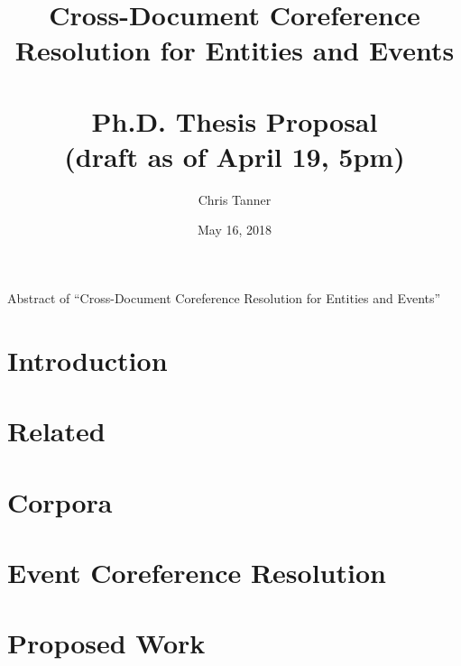 \documentclass[10pt,oneside,openany]{brownthesis}
\begin{document}
\newcommand{\thesistitle}{Cross-Document Coreference Resolution for Entities and Events}
\author{Chris Tanner}
\title{\thesistitle\\~\\ Ph.D. Thesis Proposal \\ (draft as of April 19, 5pm)}
\date{May 16, 2018}

\frontmatter %

\maketitle %

\mainmatter %


\def\abstract#1{\gdef\d@abstract{#1}}
\def\d@abstract{}
\def\abstractpage{%
  \thispagestyle{empty}
  \noindent Abstract of ``\thesistitle''
  \\
  
  \vfill}
\abstractpage
{
\singlespacing
\hypersetup{linkcolor=black}
\tableofcontents %
\doublespacing
}
\chapter{Introduction}


\chapter{Related}


\chapter{Corpora}


\chapter{Event Coreference Resolution}


\chapter{Proposed Work}


%
\backmatter %


\end{document}
